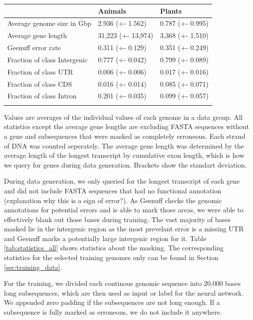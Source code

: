 \documentclass{bioinfo}
\begin{document}
\begin{methods}
\begin{table}[!t]
 {
\begin{tabular}{@{}lll@{}}
\toprule & Animals & Plants\\
\midrule
Average genome size in Gbp& 2.936 (+- 1.562) & 0.787 (+- 0.995) \\
Average gene length & 31,223 (+- 13,974)& 3,368 (+- 1,510)\\
Geenuff error rate & 0.311 (+- 0.129) & 0.351 (+- 0.249) \\
Fraction of class Intergenic  & 0.777 (+- 0.042) & 0.799 (+- 0.089) \\
Fraction of class UTR & 0.006 (+- 0.006) & 0.017 (+- 0.016) \\
Fraction of class CDS & 0.016 (+- 0.014) & 0.085 (+- 0.071) \\
Fraction of class Intron & 0.201 (+- 0.035) & 0.099 (+- 0.057) \\
\botrule
\end{tabular}}{Values are averages of the individual values of each genome in a data group. All statistics except the average gene lengths are excluding FASTA sequences without a gene and subsequences that were masked as completely erroneous. Each strand of DNA was counted seperately. The average gene length was determined by the average length of the longest transcript by cumulative exon length, which is how we query for genes during data generation. Brackets show the standart deviation.}
\end{table}

During data generation, we only queried for the longest transcript of each gene and did not include FASTA sequences that had no functional annotation (explanation why this is a sign of error?). As Geenuff checks the genomic annotations for potential errors and is able to mark those areas, we were able to effectively blank out those bases during training. The vast majority of bases masked lie in the intergenic region as the most prevelant error is a missing UTR and Geenuff marks a potentially large intergenic region for it. Table \ref{tab:statistics_all} shows statistics about the masking. The corresponding statistics for the selected training genomes only can be found in Section \ref{sec:training_data}. 
	
For the training, we divided each continous genomic sequence into 20.000 bases long subsequences, which are then used as input or label for the neural network. We appended zero padding if the subsequences are not long enough. If a subsequence is fully marked as erroneous, we do not include it anywhere.


\end{methods}
\end{document}
